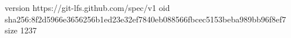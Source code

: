 version https://git-lfs.github.com/spec/v1
oid sha256:8f2d5966e3656256b1ed23e32ef7840eb088566fbcec5153beba989bb96f8ef7
size 1237
